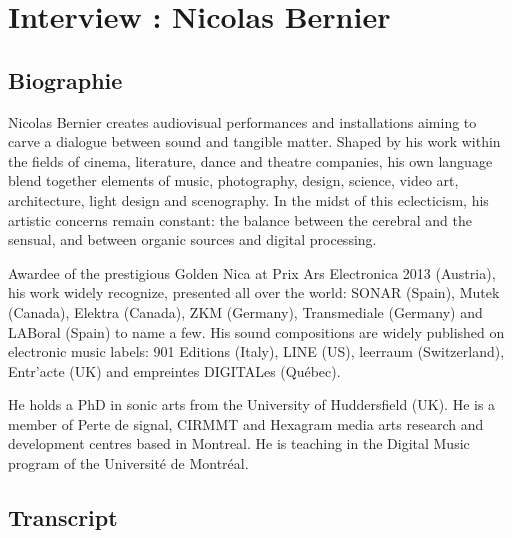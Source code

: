 \chapter{Interview : Nicolas Bernier}

\section*{Biographie}

Nicolas Bernier creates audiovisual performances and installations aiming to carve a dialogue between sound and tangible matter. Shaped by his work within the fields of cinema, literature, dance and theatre companies, his own language blend together elements of music, photography, design, science, video art, architecture, light design and scenography. In the midst of this eclecticism, his artistic concerns remain constant: the balance between the cerebral and the sensual, and between organic sources and digital processing.

Awardee of the prestigious Golden Nica at Prix Ars Electronica 2013 (Austria), his work widely recognize, presented all over the world: SONAR (Spain), Mutek (Canada), Elektra (Canada), ZKM (Germany), Transmediale (Germany) and LABoral (Spain) to name a few. His sound compositions are widely published on electronic music labels: 901 Editions (Italy), LINE (US), leerraum (Switzerland), Entr’acte (UK) and empreintes DIGITALes (Québec).

He holds a PhD in sonic arts from the University of Huddersfield (UK). He is a member of Perte de signal, CIRMMT and Hexagram media arts research and development centres based in Montreal. He is teaching in the Digital Music program of the Université de Montréal. 


\section*{Transcript}

